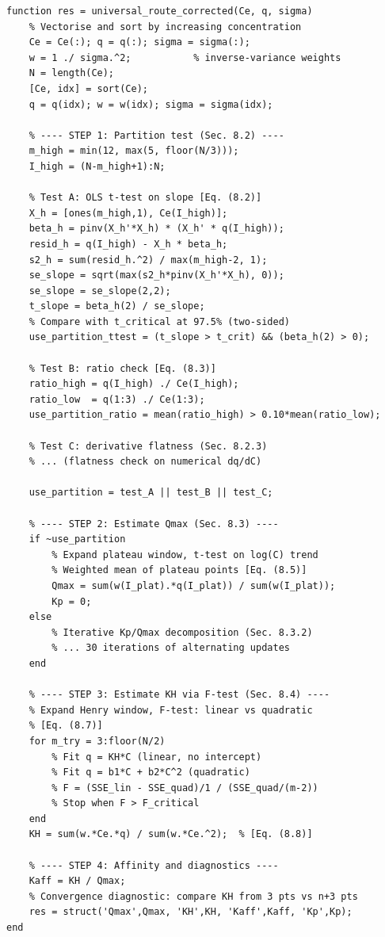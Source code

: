 \documentclass[12pt]{article}
\begin{document}
\begin{lstlisting}[caption={Core function of the universal route
  (MATLAB).  Line numbers refer to the mathematical derivations
  in Sections~\ref{sec:implementation}.1--\ref{sec:implementation}.4.},
  label=lst:core]
function res = universal_route_corrected(Ce, q, sigma)
    % Vectorise and sort by increasing concentration
    Ce = Ce(:); q = q(:); sigma = sigma(:);
    w = 1 ./ sigma.^2;           % inverse-variance weights
    N = length(Ce);
    [Ce, idx] = sort(Ce);
    q = q(idx); w = w(idx); sigma = sigma(idx);

    % ---- STEP 1: Partition test (Sec. 8.2) ----
    m_high = min(12, max(5, floor(N/3)));
    I_high = (N-m_high+1):N;

    % Test A: OLS t-test on slope [Eq. (8.2)]
    X_h = [ones(m_high,1), Ce(I_high)];
    beta_h = pinv(X_h'*X_h) * (X_h' * q(I_high));
    resid_h = q(I_high) - X_h * beta_h;
    s2_h = sum(resid_h.^2) / max(m_high-2, 1);
    se_slope = sqrt(max(s2_h*pinv(X_h'*X_h), 0));
    se_slope = se_slope(2,2);
    t_slope = beta_h(2) / se_slope;
    % Compare with t_critical at 97.5% (two-sided)
    use_partition_ttest = (t_slope > t_crit) && (beta_h(2) > 0);

    % Test B: ratio check [Eq. (8.3)]
    ratio_high = q(I_high) ./ Ce(I_high);
    ratio_low  = q(1:3) ./ Ce(1:3);
    use_partition_ratio = mean(ratio_high) > 0.10*mean(ratio_low);

    % Test C: derivative flatness (Sec. 8.2.3)
    % ... (flatness check on numerical dq/dC)

    use_partition = test_A || test_B || test_C;

    % ---- STEP 2: Estimate Qmax (Sec. 8.3) ----
    if ~use_partition
        % Expand plateau window, t-test on log(C) trend
        % Weighted mean of plateau points [Eq. (8.5)]
        Qmax = sum(w(I_plat).*q(I_plat)) / sum(w(I_plat));
        Kp = 0;
    else
        % Iterative Kp/Qmax decomposition (Sec. 8.3.2)
        % ... 30 iterations of alternating updates
    end

    % ---- STEP 3: Estimate KH via F-test (Sec. 8.4) ----
    % Expand Henry window, F-test: linear vs quadratic
    % [Eq. (8.7)]
    for m_try = 3:floor(N/2)
        % Fit q = KH*C (linear, no intercept)
        % Fit q = b1*C + b2*C^2 (quadratic)
        % F = (SSE_lin - SSE_quad)/1 / (SSE_quad/(m-2))
        % Stop when F > F_critical
    end
    KH = sum(w.*Ce.*q) / sum(w.*Ce.^2);  % [Eq. (8.8)]

    % ---- STEP 4: Affinity and diagnostics ----
    Kaff = KH / Qmax;
    % Convergence diagnostic: compare KH from 3 pts vs n+3 pts
    res = struct('Qmax',Qmax, 'KH',KH, 'Kaff',Kaff, 'Kp',Kp);
end
\end{lstlisting}
\end{document}
